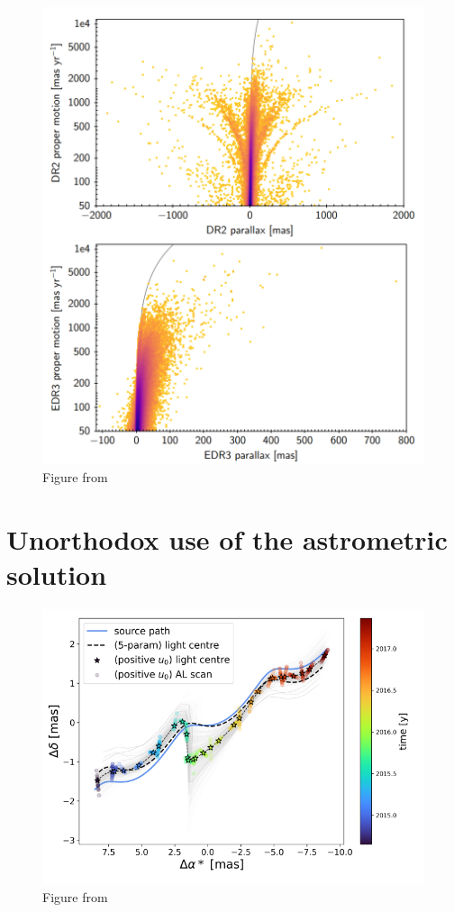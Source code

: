 \documentclass[twocolumn]{aastex631}
\begin{document}
\begin{figure}
	\includegraphics[width=\columnwidth]{parallaxvspropermotiondr2edr3crop.png}
	\caption{Figure from \cite{fabriciusGaia2021}}
\end{figure}



\section{Unorthodox use of the astrometric solution} \label{sec:unorthodox}

\begin{figure}
	\includegraphics[width=\columnwidth]{microlensingpath.png}
	\caption{Figure from \cite{jablonskaThere2022}}
\end{figure}
\end{document}
